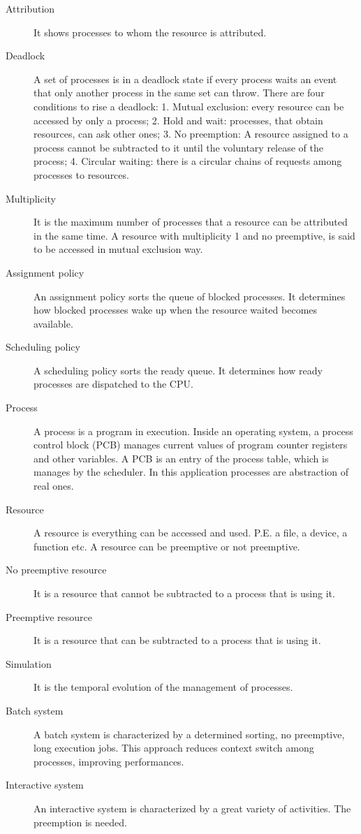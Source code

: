 \documentclass[10pt,a4paper,twoside,titlepage]{article}
\begin{document}
\begin{description}
 \item [Attribution] It shows processes to whom the resource is attributed.
 \item [Deadlock] A set of processes is in a deadlock state if every process waits an event that only another process in the same set can throw. There are four conditions to rise a deadlock: 1. Mutual exclusion: every resource can be accessed by only a process; 2. Hold and wait: processes, that obtain resources, can ask other ones; 3. No preemption: A resource assigned to a process cannot be subtracted to it until the voluntary release of the process; 4. Circular waiting: there is a circular chains of requests among processes to resources. 
 \item [Multiplicity] It is the maximum number of processes that a resource can be attributed in the same time. A resource with multiplicity 1 and no preemptive, is said to be accessed in mutual exclusion way.
 \item [Assignment policy] An assignment policy sorts the queue of blocked processes. It determines how blocked processes wake up when the resource waited becomes available.
 \item [Scheduling policy] A scheduling policy sorts the ready queue. It determines how ready processes are dispatched to the CPU.
 \item [Process] A process is a program in execution. Inside an operating system, a process control block (PCB) manages current values of program counter registers and other variables. A PCB is an entry of the process table, which is manages by the scheduler. In this application processes are abstraction of real ones.
 \item [Resource] A resource is everything can be accessed and used. P.E. a file, a device, a function etc. A resource can be preemptive or not preemptive.
 \item [No preemptive resource] It is a resource that cannot be subtracted to a process that is using it.
 \item [Preemptive resource] It is a resource that can be subtracted to a process that is using it.
 \item [Simulation] It is the temporal evolution of the management of processes.
 \item [Batch system] A batch system is characterized by a determined sorting, no preemptive, long execution jobs. This approach reduces context switch among processes, improving performances.
 \item [Interactive system] An interactive system is characterized by a great variety of activities. The preemption is needed.

\end{description}
\end{document}
